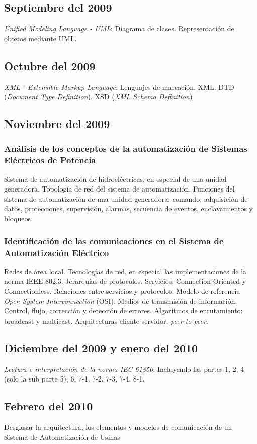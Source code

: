 \documentclass[conference,twocolumn]{IEEEtran}
\begin{document}
	\subsection{Septiembre del 2009}
		\emph{Unified Modeling Language - UML}:
			Diagrama de clases. 
			Representaci\'on de objetos mediante UML.
	\subsection{Octubre del 2009}
		\emph{XML - Extensible Markup Language}:
			Lenguajes de marcaci\'on.
			XML.
			DTD (\emph{Document Type Definition}).
			XSD (\emph{XML Schema Definition})
	\subsection{Noviembre del 2009}
		\subsubsection{An\'alisis de los conceptos de la automatizaci\'on de Sistemas El\'ectricos de Potencia}
			Sistema de automatizaci\'on de hidroel\'ectricas, en especial de una unidad generadora. 
			Topolog\'ia de red del sistema de automatizaci\'on. 
			Funciones del sistema de automatizaci\'on de una unidad generadora: comando, adquisici\'on de datos, protecciones, supervisi\'on, alarmas, secuencia de eventos, enclavamientos y bloqueos.
		\subsubsection{Identificaci\'on de las comunicaciones en el Sistema de Automatizaci\'on El\'ectrico}
			Redes de \'area local.
			Tecnolog\'ias de red, en especial las implementaciones de la norma IEEE 802.3. 
			Jerarqu\'ias de protocolos.
			Servicios: Connection-Oriented y Connectionless.
			Relaciones entre servicios y protocolos.
			Modelo de referencia \emph{Open System Interconnection} (OSI). 
			Medios de transmisi\'on de informaci\'on. 
			Control, flujo, correcci\'on y detecci\'on de errores. 
			Algoritmos de enrutamiento: broadcast y multicast.
			Arquitecturas cliente-servidor, \emph{peer-to-peer}.
	\subsection{Diciembre del 2009 y enero del 2010}	
		\emph{Lectura e interpretaci\'on de la norma IEC  61850}: Incluyendo las partes 1, 2, 4 (solo la sub parte 5), 6, 7-1, 7-2, 7-3, 7-4, 8-1.
	\subsection{Febrero del 2010}
			{Desglosar la arquitectura, los elementos y modelos de comunicaci\'on de un Sistema de Automatizaci\'on de Usinas}
\end{document}
